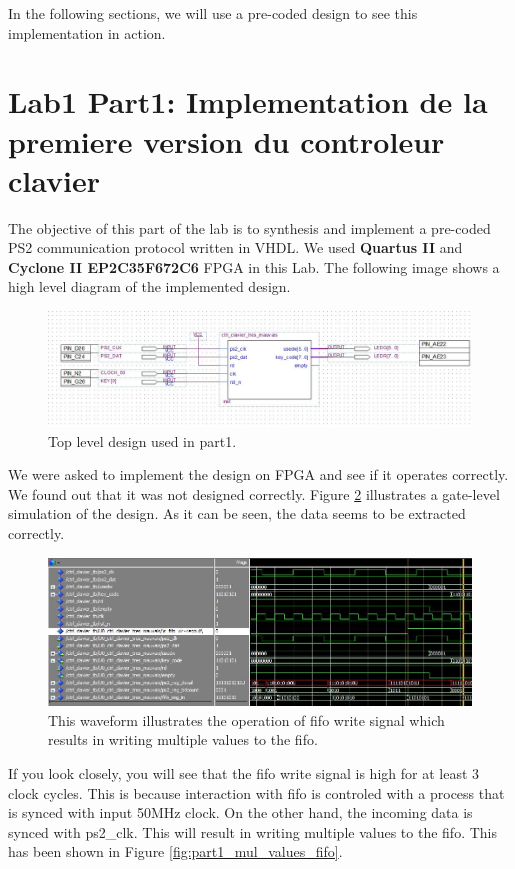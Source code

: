 \documentclass{rapportECL}
\begin{document}
In the following sections, we will use a pre-coded design to see this implementation in action.

\section{Lab1 Part1: Implementation de la premiere version du controleur clavier}
The objective of this part of the lab is to synthesis and implement a pre-coded PS2 communication protocol written in VHDL. We used \textbf{Quartus II} and \textbf{Cyclone II EP2C35F672C6} FPGA in this Lab. The following image shows a high level diagram of the implemented design. 

\begin{figure}[h]
    \centering
    \includegraphics[width=15cm]{logos/part1_top.jpg}
    \caption{Top level design used in part1.}
    \label{fig:part1_top}
\end{figure}

We were asked to implement the design on FPGA and see if it operates correctly. We found out that it was not designed correctly. Figure \ref{fig:part1_mul_write_fifo} illustrates a gate-level simulation of the design. As it can be seen, the data seems to be extracted correctly. 

\begin{figure}[h]
    \centering
    \includegraphics[width=15cm]{logos/top_part1.jpg}
    \caption{This waveform illustrates the operation of fifo write signal which results in writing multiple values to the fifo.}
    \label{fig:part1_mul_write_fifo}
\end{figure}

If you look closely, you will see that the fifo write signal is high for at least 3 clock cycles. This is because interaction with fifo is controled with a process that is synced with input 50MHz clock. On the other hand, the incoming data is synced with ps2\_clk. This will result in writing multiple values to the fifo. This has been shown in Figure \ref{fig:part1_mul_values_fifo}.
\end{document}
